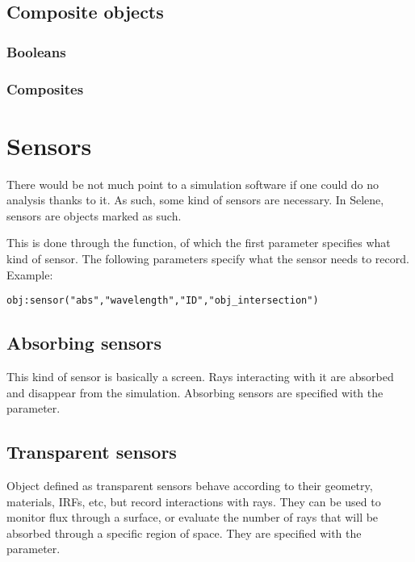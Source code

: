\subsection{Composite objects}

\subsubsection{Booleans}

\subsubsection{Composites}

\newpage
\section{Sensors}

\label{selene_sensors}
There would be not much point to a simulation software if one could do no analysis thanks to it. As such, some kind of sensors are necessary. In Selene, sensors are objects marked as such.

This is done through the  function, of which the first parameter specifies what kind of sensor. The following parameters specify what the sensor needs to record. Example:
\begin{lstlisting}
obj:sensor("abs","wavelength","ID","obj_intersection")
\end{lstlisting}

\subsection{Absorbing sensors}

This kind of sensor is basically a screen. Rays interacting with it are absorbed and disappear from the simulation. Absorbing sensors are specified with the  parameter.

\subsection{Transparent sensors}

Object defined as transparent sensors behave according to their geometry, materials, IRFs, etc, but record interactions with rays. They can be used to monitor flux through a surface, or evaluate the number of rays that will be absorbed through a specific region of space. They are specified with the  parameter.

